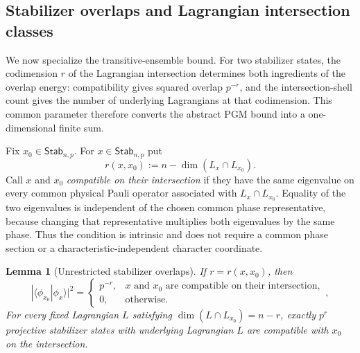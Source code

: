 \documentclass[11pt]{article}
\newcommand{\1}{\mathbf 1}
\theoremstyle{plain}
\newtheorem{lemma}[theorem]{Lemma}
\theoremstyle{definition}
\theoremstyle{remark}
\begin{document}
\subsection{Stabilizer overlaps and Lagrangian intersection classes}
\label{subsec:direct-overlaps-shells}

We now specialize the transitive-ensemble bound.  For two stabilizer states,
the codimension $r$ of the Lagrangian intersection determines both ingredients
of the overlap energy: compatibility gives squared overlap $p^{-r}$, and the
intersection-shell count gives the number of underlying Lagrangians at that
codimension.  This common parameter therefore converts the abstract PGM bound
into a one-dimensional finite sum.

Fix $x_0\in\mathsf{Stab}_{n,p}$.  For
$x\in\mathsf{Stab}_{n,p}$ put
\begin{equation}
 r(x,x_0):=n-\dim(L_x\cap L_{x_0}).
 \label{eq:unrestricted-intersection-codimension}
\end{equation}
Call $x$ and $x_0$ \emph{compatible on their intersection} if they have the
same eigenvalue on every common physical Pauli operator associated with
$L_x\cap L_{x_0}$.  Equality of the two eigenvalues is independent of the
chosen common phase representative, because changing that representative
multiplies both eigenvalues by the same phase.  Thus the condition is
intrinsic and does not require a common phase section or a
characteristic-independent character coordinate.
\begin{lemma}[Unrestricted stabilizer overlaps]
\label{lem:unrestricted-stabilizer-overlaps}
If $r=r(x,x_0)$, then
\begin{equation}
 |\langle\phi_{x_0}|\phi_x\rangle|^2
 =\begin{cases}
 p^{-r},&x\text{ and }x_0\text{ are compatible on their intersection},\\
 0,&\text{otherwise}.
 \end{cases},
 \label{eq:unrestricted-stabilizer-overlap}
\end{equation}
For every fixed Lagrangian $L$ satisfying
$\dim(L\cap L_{x_0})=n-r$, exactly $p^r$ projective stabilizer states with
underlying Lagrangian $L$ are compatible with $x_0$ on the intersection.
\end{lemma}
\end{document}
